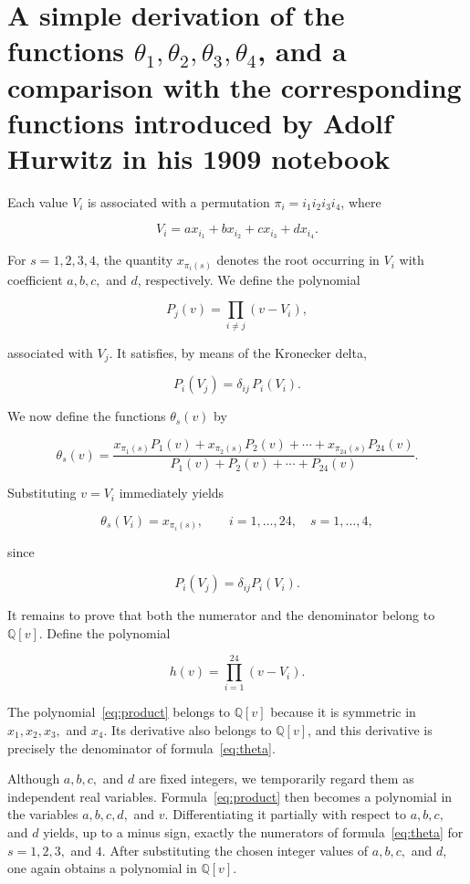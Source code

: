 \documentclass[a4paper,11pt]{article}
\begin{document}
 	
 	
 \section{A simple derivation of the functions \(\theta_1,\theta_2,\theta_3,\theta_4\), and a comparison with the corresponding functions introduced by Adolf Hurwitz in his 1909 notebook}
 
 Each value \(V_i\) is associated with a permutation
 \(\pi_i=i_1i_2i_3i_4\), where
 
 \[
 V_i=ax_{i_1}+bx_{i_2}+cx_{i_3}+dx_{i_4}.
 \]
 
 For \(s=1,2,3,4\), the quantity \(x_{\pi_i(s)}\) denotes the root occurring in \(V_i\) with coefficient \(a,b,c,\) and \(d\), respectively. We define the polynomial
 
 \[
 P_j(v)
 =
 \prod_{i\neq j}(v-V_i),
 \]
 
 associated with \(V_j\). It satisfies, by means of the Kronecker delta,
 
 \[
 P_i(V_j)=\delta_{ij}\,P_i(V_i).
 \]
 
 We now define the functions \(\theta_s(v)\) by
 
 \begin{equation}
 	\label{eq:theta}
 	\theta_s(v)=
 	\frac{
 		x_{\pi_1(s)}P_1(v)+x_{\pi_2(s)}P_2(v)+\cdots+x_{\pi_{24}(s)}P_{24}(v)
 	}
 	{
 		P_1(v)+P_2(v)+\cdots+P_{24}(v)
 	}.
 \end{equation}
 
 Substituting \(v=V_i\) immediately yields
 
 \[
 \theta_s(V_i)=x_{\pi_i(s)},
 \qquad
 i=1,\dots,24,\quad s=1,\dots,4,
 \]
 
 since
 
 \[
 P_i(V_j)=\delta_{ij}P_i(V_i).
 \]
 
 It remains to prove that both the numerator and the denominator belong to \(\mathbb{Q}[v]\). Define the polynomial
 
 \begin{equation}
 	\label{eq:product}
 	h(v)=\prod_{i=1}^{24}(v-V_i).
 \end{equation}
 
 The polynomial~\eqref{eq:product} belongs to \(\mathbb{Q}[v]\) because it is symmetric in \(x_1,x_2,x_3,\) and \(x_4\). Its derivative also belongs to \(\mathbb{Q}[v]\), and this derivative is precisely the denominator of formula~\eqref{eq:theta}.
 
 Although \(a,b,c,\) and \(d\) are fixed integers, we temporarily regard them as independent real variables. Formula~\eqref{eq:product} then becomes a polynomial in the variables \(a,b,c,d,\) and \(v\). Differentiating it partially with respect to \(a,b,c,\) and \(d\) yields, up to a minus sign, exactly the numerators of formula~\eqref{eq:theta} for \(s=1,2,3,\) and \(4\). After substituting the chosen integer values of \(a,b,c,\) and \(d\), one again obtains a polynomial in \(\mathbb{Q}[v]\).
 
\end{document}
